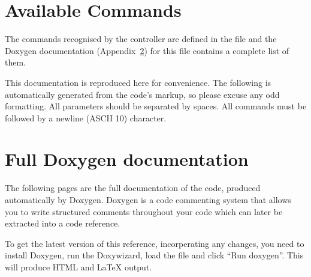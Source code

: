 \documentclass[11pt]{report}
\begin{document}
\begin{appendices}



\chapter{Available Commands} %
\label{chap:available_commands}

The commands recognised by the controller are defined in the file  and the Doxygen documentation (Appendix~\ref{chap:full_doxygen_documentation}) for this file contains a complete list of them. 

This documentation is reproduced here for convenience. The following is automatically generated from the code's markup, so please excuse any odd formatting. All parameters should be separated by spaces. All commands must be followed by a newline (ASCII 10) character. 



\chapter{Full Doxygen documentation} %
\label{chap:full_doxygen_documentation}

The following pages are the full documentation of the code, produced automatically by Doxygen. Doxygen is a code commenting system that allows you to write structured comments throughout your code which can later be extracted into a code reference.

To get the latest version of this reference, incorperating any changes, you need to install Doxygen, run the Doxywizard, load the file  and click ``Run doxygen''. This will produce HTML and \LaTeX{} output. 


\end{appendices}
\end{document}
